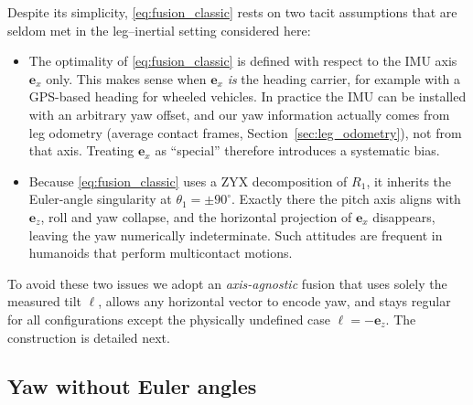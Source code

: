 \documentclass{IJCAS}
\begin{document}
Despite its simplicity, \eqref{eq:fusion_classic} rests on two tacit
assumptions that are seldom met in the leg–inertial setting considered
here:

\begin{itemize}
\item The optimality of \eqref{eq:fusion_classic} is defined with
      respect to the IMU axis $\boldsymbol{e}_{x}$ only.  
      This makes sense when $\boldsymbol{e}_{x}$ \emph{is} the heading
      carrier, for example with a GPS-based heading for wheeled vehicles.  
      In practice the IMU can be installed with an arbitrary yaw
      offset, and our yaw information actually comes from leg odometry
      (average contact frames, Section~\ref{sec:leg_odometry}), not from
      that axis.  Treating $\boldsymbol{e}_{x}$ as ``special'' therefore
      introduces a systematic bias.

\item Because \eqref{eq:fusion_classic} uses a ZYX decomposition of
      $R_{1}$, it inherits the Euler-angle singularity at
      $\theta_{1}= \pm 90^{\circ}$.  
      Exactly there the pitch axis aligns with
      $\boldsymbol{e}_{z}$, roll and yaw collapse, and the horizontal
      projection of $\boldsymbol{e}_{x}$ disappears, leaving the yaw
      numerically indeterminate.  
      Such attitudes are frequent in humanoids that perform
      multicontact motions.
\end{itemize}

To avoid these two issues we adopt an \emph{axis-agnostic} fusion that
uses solely the measured tilt $\boldsymbol{\ell}$, allows any horizontal
vector to encode yaw, and stays regular for all configurations except
the physically undefined case $\boldsymbol{\ell}=-\boldsymbol{e}_{z}$.
The construction is detailed next.

\subsection{Yaw without Euler angles}
\label{sec:yaw_no_euler}
\end{document}
